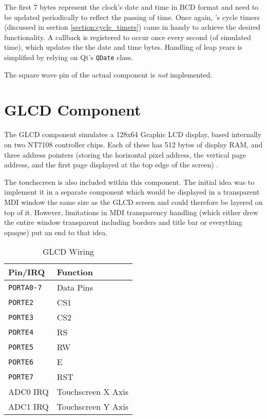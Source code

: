The first 7 bytes represent the clock's date and time in \ac{BCD} format and need
to be updated periodically to reflect the passing of time. Once again,
\simavr's cycle timers (discussed in section \ref{section:cycle_timers}) came in
handy to achieve the desired functionality. A callback is registered to occur
once every second (of simulated time), which updates the the date
and time bytes. Handling of leap years is simplified by relying on Qt's
\lstinline|QDate| class.

The square wave pin of the actual component is \emph{not} implemented.

\section{\acf{GLCD} Component} \label{section:component_glcd}

The \ac{GLCD} component simulates a 128x64 Graphic \ac{LCD} display, based internally
on two NT7108 controller chips. Each of these has 512 bytes of display \ac{RAM},
and three address pointers (storing the horizontal pixel address, the vertical page
address, and the first page displayed at the top edge of the screen)
\cite{winstar01, samsung01, neotec01}.

The touchscreen is also included within this component. The initial idea was to
implement it in a separate component which would be displayed in a transparent
\ac{MDI} window the same size as the \ac{GLCD} screen and could therefore be
layered on top of it. However, limitations in \ac{MDI} transparency handling
(which either drew the entire window transparent including borders and title bar
or everything opaque) put an end to that idea.

\begin{table}[ht]
\centering
\begin{tabular}{ll}
\toprule

Pin/\ac{IRQ}        & Function \\

\midrule

\lstinline|PORTA0-7|& Data Pins\\
\lstinline|PORTE2|  & \acf{CS1}\\
\lstinline|PORTE3|  & \acf{CS2}\\
\lstinline|PORTE4|  & \acf{RS}\\
\lstinline|PORTE5|  & \acf{RW}\\
\lstinline|PORTE6|  & \acf{E}\\
\lstinline|PORTE7|  & \acf{RST}\\
\ac{ADC}0 \ac{IRQ}  & Touchscreen X Axis\\
\ac{ADC}1 \ac{IRQ}  & Touchscreen Y Axis\\

\bottomrule
\end{tabular}
\caption{\ac{GLCD} Wiring}
\label{tab:wiring_glcd}
\end{table}


